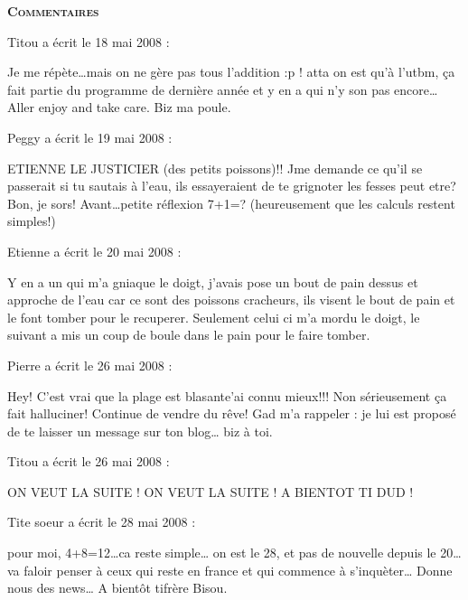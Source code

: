 \bigskip
\textbf{\textsc{Commentaires}}

\medskip
Titou a écrit le 18 mai 2008 :
\begin{displayquote}
Je me répète\dots mais on ne gère pas tous l'addition :p ! atta on est qu'à l'utbm, ça fait partie du programme de dernière année  et y en a qui n'y son pas encore\dots
Aller enjoy and take care. Biz ma poule.
\end{displayquote}

\medskip
Peggy a écrit le 19 mai 2008 :
\begin{displayquote}
ETIENNE LE JUSTICIER (des petits poissons)!!
Jme demande ce qu'il se passerait si tu sautais à l'eau, ils essayeraient de te grignoter les fesses peut etre?
Bon, je sors!
Avant\dots petite réflexion 7+1=? (heureusement que les calculs restent simples!)
\end{displayquote}

\medskip
Etienne a écrit le 20 mai 2008 :
\begin{displayquote}
Y en a un qui m'a gniaque le doigt, j'avais pose un bout de pain dessus et approche de l'eau car ce sont des poissons cracheurs, ils visent le bout de pain et le font tomber pour le recuperer. Seulement celui ci m'a mordu le doigt, le suivant a mis un coup de boule dans le pain pour le faire tomber.
\end{displayquote}

\medskip
Pierre a écrit le 26 mai 2008 :
\begin{displayquote}
Hey!
C'est vrai que la plage est blasante\dotsj'ai connu mieux!!!
Non sérieusement ça fait halluciner!
Continue de vendre du rêve!
Gad m'a rappeler : je lui est proposé de te laisser un message sur ton blog\dots
biz à toi.
\end{displayquote}

\medskip
Titou a écrit le 26 mai 2008 :
\begin{displayquote}
ON VEUT LA SUITE ! ON VEUT LA SUITE !
A BIENTOT TI DUD !
\end{displayquote}

\medskip
Tite soeur a écrit le 28 mai 2008 :
\begin{displayquote}
pour moi, 4+8=12\dots ca reste simple\dots
on est le 28, et pas de nouvelle depuis le 20\dots va faloir penser à ceux qui reste en france et qui commence à s'inquèter\dots
Donne nous des news\dots
A bientôt tifrère
Bisou.
\end{displayquote}

\vfill
